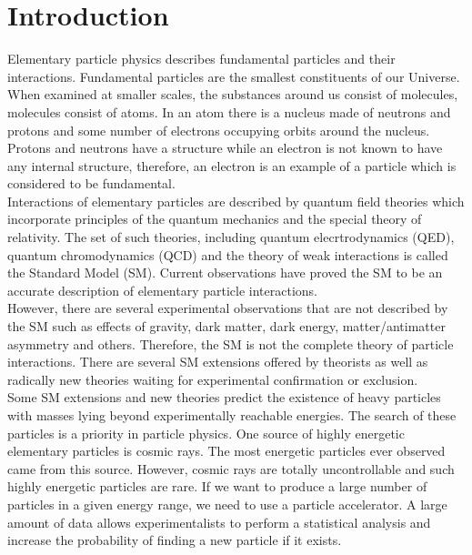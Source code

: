 \section{Introduction}
\label{sec:intro}

Elementary particle physics describes fundamental particles and their interactions. Fundamental particles are the smallest constituents of our Universe. When examined at smaller scales, the substances around us consist of molecules, molecules consist of atoms. In an atom there is a nucleus made of neutrons and protons and some number of electrons occupying orbits around the nucleus. Protons and neutrons have a structure while an electron is not known to have any internal structure, therefore, an electron is an example of a particle which is considered to be fundamental.\\

Interactions of elementary particles are described by quantum field theories which incorporate principles of the quantum mechanics and the special theory of relativity. The set of such theories, including quantum elecrtrodynamics (QED), quantum chromodynamics (QCD) and the theory of weak interactions is called the Standard Model (SM). Current observations have proved the SM to be an accurate description of elementary particle interactions. \\ 

However, there are several experimental observations that are not described by the SM such as effects of gravity, dark matter, dark energy, matter/antimatter asymmetry and others. Therefore, the SM is not the complete theory of particle interactions. There are several SM extensions offered by theorists as well as radically new theories waiting for experimental confirmation or exclusion. \\

Some SM extensions and new theories predict the existence of heavy particles with masses lying beyond experimentally reachable energies. The search of these particles is a priority in particle physics. One source of highly energetic elementary particles is cosmic rays. The most energetic particles ever observed came from this source. However, cosmic rays are totally uncontrollable and such highly energetic particles are rare. If we want to produce a large number of particles in a given energy range, we need to use a particle accelerator. A large amount of data allows experimentalists to perform a statistical analysis and increase the probability of finding a new particle if it exists.\\

